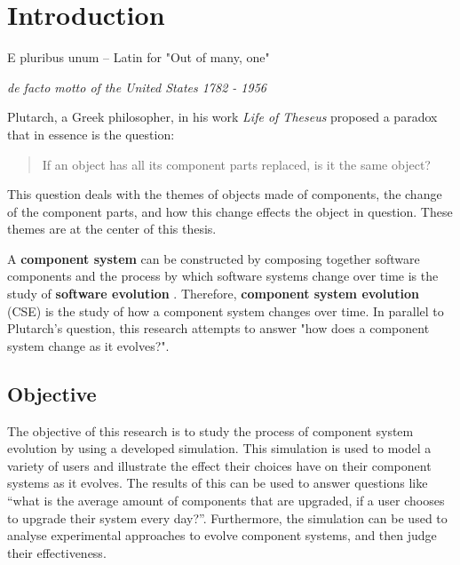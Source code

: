 \chapter{Introduction}
\label{introduction}
\epigraph{E pluribus unum -- Latin for "Out of many, one"}
{\textit{de facto motto of the United States 1782 - 1956}}
Plutarch, a Greek philosopher, in his work \textit{Life of Theseus} 
proposed a paradox that in essence is the question:
\begin{quote}
If an object has all its component parts replaced, is it the same object?
\end{quote}
This question deals with the themes of objects made of components, the change of the component parts,
and how this change effects the object in question.
These themes are at the center of this thesis.

A \textbf{component system} can be constructed by composing together software components \citep{Szyperski2002}
and the process by which software systems change over time is the study of \textbf{software evolution} \citep{lehman1980}.
Therefore, \textbf{component system evolution} (CSE) is the study of how a component system changes over time.
In parallel to Plutarch's question, this research attempts to answer "how does a component system change as it evolves?".

\section{Objective}
The objective of this research is to study the process of component system evolution by using a developed simulation.
This simulation is used to model a variety of users and illustrate the effect their choices have on their component systems as it evolves.
The results of this can be used to answer questions like ``what is the average amount of components that are upgraded, if a user chooses to upgrade their system every day?''.
Furthermore, the simulation can be used to analyse experimental approaches to evolve component systems, and then judge their effectiveness.


